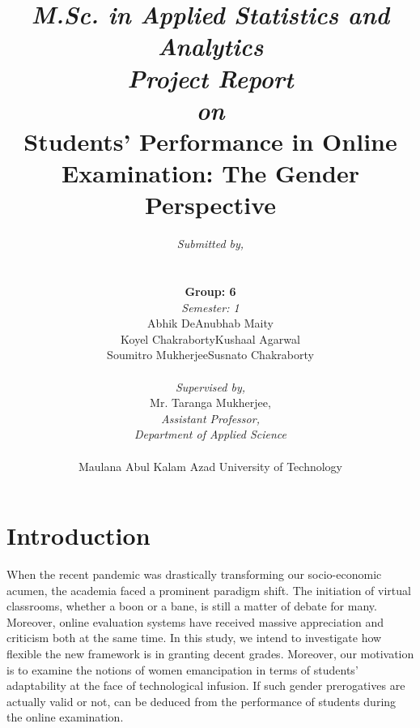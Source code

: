 \documentclass[12pt,a4paper]{report}
\begin{document}
\title{\vspace{-105pt}\hspace{-140pt}\textit{\small{M.Sc. in Applied Statistics and Analytics}}\\\vspace{80pt}\textit{Project Report\\on}\\\textbf{\huge{Students' Performance in Online Examination: The Gender Perspective}}\vspace{-15pt}}
\date{}
\author{\textit{\Large{Submitted by,}}\\[4pt]
\begin{tabular}{cc}
    \hline
    \hline
    \\[-3pt]
    \multicolumn{2}{c}{\textbf{Group: 6}}\\
    \multicolumn{2}{c}{\textit{Semester: 1}}\\[8pt]
    \quad \Large{Abhik De} & \Large{Anubhab Maity}\\
    \quad \Large{Koyel Chakraborty} & \Large{Kushaal Agarwal}\\
    \quad \Large{Soumitro Mukherjee} & \Large{Susnato Chakraborty}\\[12 pt]
    \hline
    \hline
\end{tabular}
\\[70 pt]
\textit{\Large{Supervised by,}}\\[10 pt]
\Large{Mr. Taranga Mukherjee,}\\
\large{\textit{Assistant Professor,}}\\
\large{\textit{Department of Applied Science}}\\
\vspace{66pt}\\
\large{Maulana Abul Kalam Azad University of Technology}}
\maketitle
\tableofcontents
\pagebreak
\section{Introduction}
\justifying
\Large{When the recent pandemic was drastically transforming our socio-economic acumen, the academia faced a prominent paradigm shift. The initiation of virtual classrooms, whether a boon or a bane, is still a matter of debate for many. Moreover, online evaluation systems have received massive appreciation and criticism both at the same time. In this study, we intend to investigate how flexible the new framework is in granting decent grades. Moreover, our motivation is to examine the notions of women emancipation in terms of students' adaptability at the face of technological infusion. If such gender prerogatives are actually valid or not, can be deduced from the performance of students during the online examination.}
\end{document}

